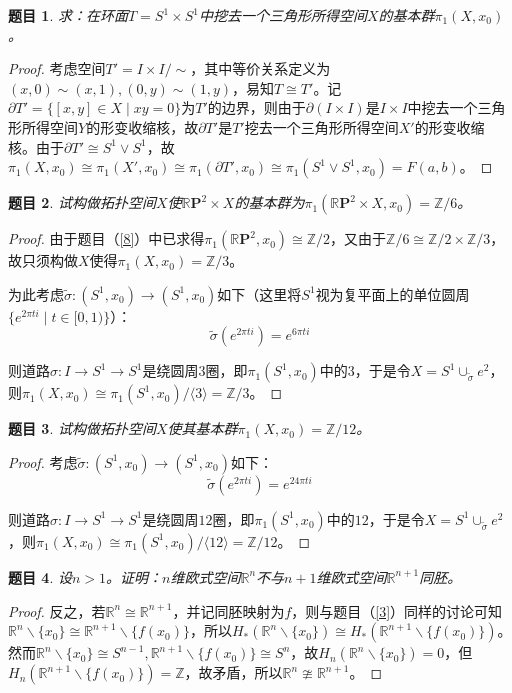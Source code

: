\documentclass[UTF-8,11pt,fancyhdr,hyperref,titlepage]{ctexart}
\theoremstyle{question}
\newtheorem{timu}{题目}
\theoremstyle{theorem}
\theoremstyle{definition}
\theoremstyle{remark}
\def\RR{{\mathbb R}}
\def\ZZ{{\mathbb Z}}
\def\RP{\mathbb{R}\mathbf{P}}
\def\<{\langle}
\def\>{\rangle}
\def\longto{\longrightarrow}
\def\To{\longto}
\begin{document}
\begin{timu}\label{9}
  求：在环面$T=S^1\times S^1$中挖去一个三角形所得空间$X$的基本群$\pi_1(X,x_0)$。
\end{timu}
\begin{proof}
  考虑空间$T'=I\times I/\sim$，其中等价关系定义为$(x,0)\sim(x,1), (0,y)\sim(1,y)$，易知$T\cong T'$。记$\partial T'=\{[x,y]\in X\mid xy=0\}$为$T'$的边界，则由于$\partial (I\times I)$是$I\times I$中挖去一个三角形所得空间$Y$的形变收缩核，故$\partial T'$是$T'$挖去一个三角形所得空间$X'$的形变收缩核。由于$\partial T'\cong S^1\vee S^1$，故$\pi_1(X,x_0)\cong\pi_1(X',x_0)\cong\pi_1(\partial T',x_0)\cong\pi_1(S^1\vee S^1,x_0)=F(a,b)$。
\end{proof}

\begin{timu}\label{10}
  试构做拓扑空间$X$使$\RP^2\times X$的基本群为$\pi_1(\RP^2\times X,x_0)=\ZZ/6$。
\end{timu}
\begin{proof}
  由于题目（\ref{8}）中已求得$\pi_1(\RP^2,x_0)\cong\ZZ/2$，又由于$\ZZ/6\cong\ZZ/2\times\ZZ/3$，故只须构做$X$使得$\pi_1(X,x_0)=\ZZ/3$。

  为此考虑$\widetilde{\sigma}\colon(S^1,x_0)\To(S^1,x_0)$如下（这里将$S^1$视为复平面上的单位圆周$\{e^{2\pi ti}\mid t\in[0,1)\}$）：
  \begin{equation*}
    \widetilde{\sigma}(e^{2\pi ti})=e^{6\pi ti}
  \end{equation*}
  
  则道路$\sigma\colon I\To S^1\To S^1$是绕圆周$3$圈，即$\pi_1(S^1,x_0)$中的$3$，于是令$X=S^1\cup_{\widetilde{\sigma}}e^2$，则$\pi_1(X,x_0)\cong\pi_1(S^1,x_0)/\<3\>=\ZZ/3$。
\end{proof}

\begin{timu}\label{11}
  试构做拓扑空间$X$使其基本群$\pi_1(X,x_0)=\ZZ/12$。
\end{timu}
\begin{proof}
  考虑$\widetilde{\sigma}\colon(S^1,x_0)\To(S^1,x_0)$如下：
  \begin{equation*}
    \widetilde{\sigma}(e^{2\pi ti})=e^{24\pi ti}
  \end{equation*}
  
  则道路$\sigma\colon I\To S^1\To S^1$是绕圆周$12$圈，即$\pi_1(S^1,x_0)$中的$12$，于是令$X=S^1\cup_{\widetilde{\sigma}}e^2$，则$\pi_1(X,x_0)\cong\pi_1(S^1,x_0)/\<12\>=\ZZ/12$。
\end{proof}

\begin{timu}\label{12}
  设$n>1$。证明：$n$维欧式空间$\RR^n$不与$n+1$维欧式空间$\RR^{n+1}$同胚。
\end{timu}
\begin{proof}
  反之，若$\RR^n\cong\RR^{n+1}$，并记同胚映射为$f$，则与题目（\ref{3}）同样的讨论可知$\RR^n\backslash\{x_0\}\cong\RR^{n+1}\backslash\{f(x_0)\}$，所以$H_{\ast}(\RR^n\backslash\{x_0\})\cong H_{\ast}(\RR^{n+1}\backslash\{f(x_0)\})$。然而$\RR^n\backslash\{x_0\}\cong S^{n-1}, \RR^{n+1}\backslash\{f(x_0)\}\cong S^n$，故$H_n(\RR^n\backslash\{x_0\})=0$，但$H_n(\RR^{n+1}\backslash\{f(x_0)\})=\ZZ$，故矛盾，所以$\RR^n\ncong\RR^{n+1}$。
\end{proof}
\end{document}
